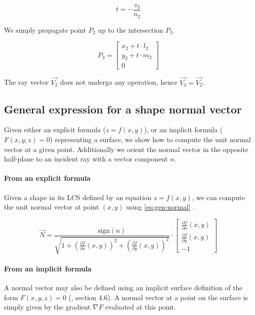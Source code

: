 \begin{equation}
t = - \frac{z_2}{n_2}
\end{equation}

We simply propagate point $P_2$ up to the intersection $P_3$.

\begin{equation}
P_3 = \begin{bmatrix}
x_2 + t \cdot l_2 \\
y_2 + t \cdot m_2 \\
0
\end{bmatrix}
\end{equation}

The ray vector $\overrightarrow{V_2}$ does not undergo any operation, hence
$\overrightarrow{V_3} = \overrightarrow{V_2}$.

\subsection{General expression for a shape normal vector}
Given either an explicit formula ($z = f(x, y)$), or an implicit
formula ($F(x, y, z) = 0$) representing a surface, we show how
to compute the unit normal vector at a given point. Additionally
we orient the normal vector in the opposite half-plane to an incident
ray with a vector component $n$.

\paragraph{From an explicit formula}
Given a shape in its \gls{LCS} defined by an equation $z = f(x, y)$,
we can compute the unit normal vector at point $(x, y)$ using
\cref{eq:gen-normal} \cite{mathworld:normal-vector}. 

\begin{equation} \label{eq:gen-normal}
\overrightarrow{N} =
\frac{\textrm{sign}(n)}
     {\sqrt{1 + \left(\frac{\partial f}{\partial x}(x, y)\right)^2 +
                \left(\frac{\partial f}{\partial y}(x, y)\right)^2}}
\cdot
\begin{bmatrix}
\frac{\partial f}{\partial x}(x, y) \\
\frac{\partial f}{\partial y}(x, y) \\
-1
\end{bmatrix}
\end{equation}

\paragraph{From an implicit formula}
A normal vector may also be defined using an implicit surface definition of
the form $F(x, y, z) = 0$ (\cite{wiki:normal}, \cite{Welford:1986} section 4.6).
A normal vector at a point on the surface is simply given by the gradient
$\nabla F$ evaluated at this point.


